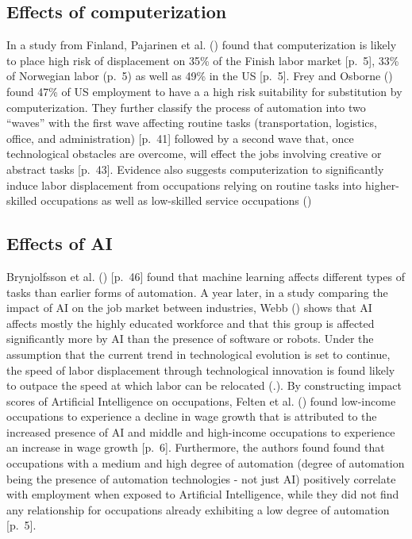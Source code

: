 \documentclass[
  11,
  a4paperpaper,
]{article}
\begin{document}
\subsection{Effects of
computerization}\label{sec-effects-of-computerization}

In a study from Finland, Pajarinen et al.
() found that
computerization is likely to place high risk of displacement on 35\% of
the Finish labor market {[}p.~5{]}, 33\% of Norwegian labor (p.~5) as
well as 49\% in the US {[}p.~5{]}. Frey and Osborne
() found 47\% of US
employment to have a a high risk suitability for substitution by
computerization. They further classify the process of automation into
two ``waves'' with the first wave affecting routine tasks
(transportation, logistics, office, and administration) {[}p.~41{]}
followed by a second wave that, once technological obstacles are
overcome, will effect the jobs involving creative or abstract tasks
{[}p.~43{]}. Evidence also suggests computerization to significantly
induce labor displacement from occupations relying on routine tasks into
higher-skilled occupations as well as low-skilled service occupations
()

\subsection{Effects of AI}\label{sec-effects-of-ai}

Brynjolfsson et al. ()
{[}p.~46{]} found that machine learning affects different types of tasks
than earlier forms of automation. A year later, in a study comparing the
impact of AI on the job market between industries, Webb
() shows that AI affects
mostly the highly educated workforce and that this group is affected
significantly more by AI than the presence of software or robots. Under
the assumption that the current trend in technological evolution is set
to continue, the speed of labor displacement through technological
innovation is found likely to outpace the speed at which labor can be
relocated (.). By constructing impact scores of Artificial Intelligence on
occupations, Felten et al. ()
found low-income occupations to experience a decline in wage growth that
is attributed to the increased presence of AI and middle and high-income
occupations to experience an increase in wage growth {[}p.~6{]}.
Furthermore, the authors found found that occupations with a medium and
high degree of automation (degree of automation being the presence of
automation technologies - not just AI) positively correlate with
employment when exposed to Artificial Intelligence, while they did not
find any relationship for occupations already exhibiting a low degree of
automation {[}p.~5{]}.
\end{document}
